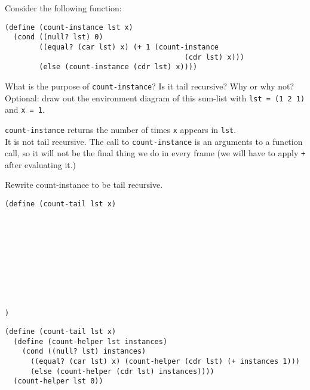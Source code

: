\begin{blocksection}
\question Consider the following function:

\begin{lstlisting}
(define (count-instance lst x)
  (cond ((null? lst) 0)
        ((equal? (car lst) x) (+ 1 (count-instance
                                          (cdr lst) x)))
        (else (count-instance (cdr lst) x))))
\end{lstlisting}

\vspace{2\baselineskip}

What is the purpose of \texttt{count-instance}? Is it tail recursive? Why or why not?
\newline
Optional: draw out the environment diagram of this sum-list with \texttt{lst = (1 2 1)} and \texttt{x = 1}.

\begin{solution}[0.5in]
\texttt{count-instance} returns the number of times \texttt{x} appears in \texttt{lst}.
\\It is not tail recursive. The call to \texttt{count-instance} is an arguments to a function call, so it will not be the final thing we do in every frame (we will have to apply \texttt{+} after evaluating it.)
\end{solution}


\question Rewrite count-instance to be tail recursive.

\begin{lstlisting}
(define (count-tail lst x)










)
\end{lstlisting}

\begin{solution}[0.5in]
\begin{lstlisting}
(define (count-tail lst x)
  (define (count-helper lst instances)
    (cond ((null? lst) instances)
      ((equal? (car lst) x) (count-helper (cdr lst) (+ instances 1)))
      (else (count-helper (cdr lst) instances))))
  (count-helper lst 0))
\end{lstlisting}
\end{solution}
\end{blocksection}

